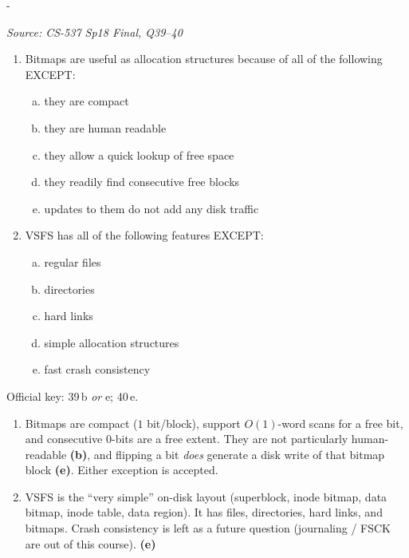 \documentclass[11pt,a4paper]{article}
\makeatletter
\newcommand{\keepspace}[1]{\par\penalty-100\begingroup
  \setlength{\dimen@}{#1}\dimen@ii\pagegoal\advance\dimen@ii-\pagetotal
  \ifdim\dimen@>\dimen@ii\ifdim\dimen@ii>\z@\vfil\fi\break\fi\endgroup}
\newcounter{qn}[section]
\newenvironment{Qn}[4]{%
  \refstepcounter{qn}\keepspace{7\baselineskip}%
  \begin{tcolorbox}[qboxstyle, title={Q\thesection.\theqn\ \ [#1 \textbar\ #2]\ \ #4}]%
  {\footnotesize\color{g3}\textit{Source: #3}}\par\smallskip%
}{%
  \end{tcolorbox}%
}
\newenvironment{Sol}{%
  \begin{tcolorbox}[sboxstyle, title={Solution}]%
}{%
  \end{tcolorbox}\vspace{0.35em}%
}
\makeatother
\begin{document}
\begin{Qn}{Easy-Medium}{Lect 24}{CS-537 Sp18 Final, Q39--40}{Why bitmaps; what VSFS does not provide}
\begin{enumerate}[(39)]
\item Bitmaps are useful as allocation structures because of all of
      the following EXCEPT:
\begin{enumerate}[(a)]
\item they are compact
\item they are human readable
\item they allow a quick lookup of free space
\item they readily find consecutive free blocks
\item updates to them do not add any disk traffic
\end{enumerate}
\item VSFS has all of the following features EXCEPT:
\begin{enumerate}[(a)]
\item regular files
\item directories
\item hard links
\item simple allocation structures
\item fast crash consistency
\end{enumerate}
\end{enumerate}
\end{Qn}
\begin{Sol}
Official key: 39\,b \emph{or} e; 40\,e.
\begin{enumerate}[(39)]
\item Bitmaps are compact ($1$ bit/block), support $O(1)$-word scans
      for a free bit, and consecutive $0$-bits are a free extent.
      They are not particularly human-readable \textbf{(b)}, and
      flipping a bit \emph{does} generate a disk write of that bitmap
      block \textbf{(e)}. Either exception is accepted.
\item VSFS is the ``very simple'' on-disk layout (superblock, inode
      bitmap, data bitmap, inode table, data region). It has files,
      directories, hard links, and bitmaps. Crash consistency is
      left as a future question (journaling / FSCK are out of this
      course). \textbf{(e)}
\end{enumerate}
\end{Sol}
\end{document}
